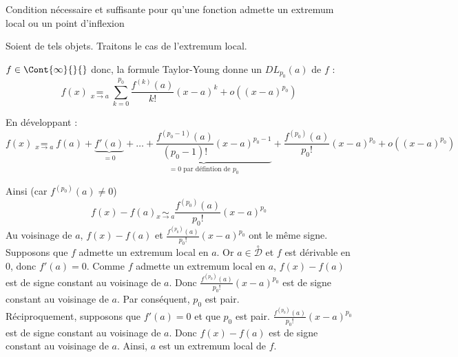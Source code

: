 \documentclass{article}
\begin{document}
	\begin{question_kholle}
		[ Soient $f \in \Cont{\infty}{\mathcal{D}}{}$ et $a \in \overset{\circ}{\mathcal{D}}$. Supposons que $E_0 = \left\{ p \in \N^* \setminus \{1\} \;|\; f^{(p)}(a) \neq 0 \right\}$ est non vide. \\
		Posons $p_0 = \min E_0$. \\
		$f$ admet un extremum local en $a$ si et seulement si $f'(a) = 0$ et $p_0$ est pair. \\
		$f$ admet un point d'inflexion en $a$ si et seulement si $p_0$ est impair. ]
		{Condition nécessaire et suffisante pour qu'une fonction \Cont{\infty}{}{} admette un extremum local ou un point d'inflexion}
		
		Soient de tels objets. Traitons le cas de l'extremum local.
		
		\noindent $f \in \Cont{\infty}{}{}$ donc, la formule Taylor-Young donne un $DL_{p_0}(a)$ de $f$ :
		\begin{equation*}
			f(x) \underset{x \rightarrow a}{=}
			\sum_{k=0}^{p_0} \frac{f^{(k)}(a)}{k!} (x-a)^k + o \left( (x-a)^{p_0} \right)
		\end{equation*}
		
		En développant :
		\begin{equation*}
			f(x) \underset{x \rightarrow a}{=}
			f(a) + \underbrace{f'(a)}_{= 0} + \underbrace{\ldots + \frac{f^{(p_0-1)}(a)}{(p_0-1)!} (x-a)^{p_0-1}}_{= 0 \text{ par défintion de }p_0} + \frac{f^{(p_0)}(a)}{p_0!} (x-a)^{p_0} + o \left( (x-a)^{p_0} \right)
		\end{equation*}
		
		Ainsi (car $f^{(p_0)}(a) \neq 0$)
		\begin{equation}
			f(x) - f(a) \underset{x \rightarrow a}{\sim} \frac{f^{(p_0)}(a)}{p_0!} (x-a)^{p_0}
		\end{equation}
		Au voisinage de $a$, $f(x) - f(a)$ et $\frac{f^{(p_0)}(a)}{p_0!} (x-a)^{p_0}$ ont le même signe.
		\\
		
		Supposons que $f$ admette un extremum local en $a$.
		Or $a \in \overset{\circ}{\mathcal{D}}$ et $f$ est dérivable en 0, donc $f'(a) = 0$.
		Comme $f$ admette un extremum local en $a$, $f(x) - f(a)$ est de signe constant au voisinage de $a$.
		Donc $\frac{f^{(p_0)}(a)}{p_0!} (x-a)^{p_0}$ est de signe constant au voisinage de $a$.
		Par conséquent, $p_0$ est pair.
		\\
		
		Réciproquement, supposons que $f'(a) = 0$ et que $p_0$ est pair. $\frac{f^{(p_0)}(a)}{p_0!} (x-a)^{p_0}$ est de signe constant au voisinage de $a$. Donc $f(x) - f(a)$ est de signe constant au voisinage de $a$. Ainsi, $a$ est un extremum local de $f$.
		\\
		

\end{question_kholle}
\end{document}
